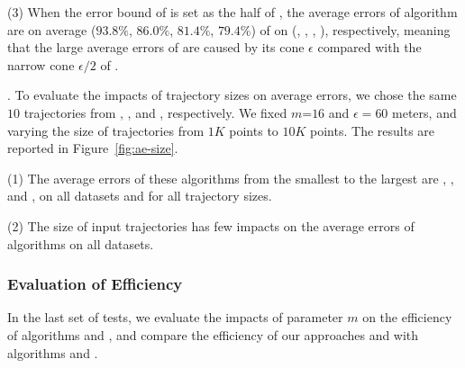 \ni(3) When the error bound of \cista is set as the half of \cist, the average errors of algorithm \cista are on average ($93.8\%$, $86.0\%$, $81.4\%$, {$79.4\%$}) of \cist on (\truck, \sercar, \geolife, \pricar), respectively, meaning that the large average errors of \cista are caused by its cone \wrt $\epsilon$ compared with the narrow cone \wrt $\epsilon/2$ of \cist.


.
To evaluate the impacts of trajectory sizes on average errors, we chose the same {$10$} trajectories from \truck, \sercar, \geolife and \pricar, respectively.
We fixed {$m$=$16$} and $\epsilon = 60$ meters, and varying the size  of trajectories from $1K$ points to $10K$ points.
%
The results are reported in Figure~\ref{fig:ae-size}.

\ni(1) The average errors of these algorithms from the smallest to the largest are \squishe, \dps, \cist and \cista, on all datasets and for all trajectory sizes. %

\ni(2) The size of input trajectories has few impacts on the average errors of \lsa algorithms on all datasets.




\subsubsection{Evaluation of Efficiency}


In the last set of tests, we evaluate the impacts of parameter $m$ on the efficiency of algorithms \cist and \cista, and compare the efficiency of our approaches \cist and \cista with algorithms \dps and \squishe.
%





